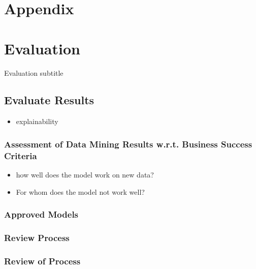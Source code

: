 \documentclass[
  american,
  10,
  a4paper,
]{book}
\providecommand{\tightlist}{%
  \setlength{\itemsep}{0pt}\setlength{\parskip}{0pt}}
\theoremstyle{definition}
\theoremstyle{remark}
\begin{document}
\chapter*{Appendix}\label{appendix-1}


\chapter{Evaluation}\label{evaluation-1}

Evaluation subtitle

\hfill\break

\section{Evaluate Results}\label{evaluate-results}

\begin{itemize}
\tightlist
\item
  explainability
\end{itemize}

\subsection{Assessment of Data Mining Results w.r.t. Business Success
Criteria}\label{assessment-of-data-mining-results-w.r.t.-business-success-criteria}

\begin{itemize}
\item
  how well does the model work on new data?
\item
  For whom does the model not work well?
\end{itemize}

\subsection{Approved Models}\label{approved-models}

\subsection{Review Process}\label{review-process}

\subsection{Review of Process}\label{review-of-process}
\end{document}
